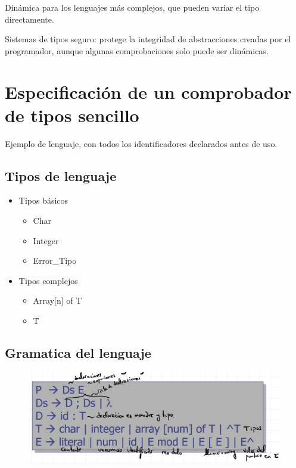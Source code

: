 \documentclass[12pt, twoside, openright]{report} %
\begin{document}
Dinámica para los lenguajes más complejos, que pueden variar el tipo directamente.

Sistemas de tipos seguro: protege la integridad de abstracciones creadas por el programador, aunque algunas comprobaciones solo puede ser dinámicas.

\section{Especificación de un comprobador de tipos sencillo}

Ejemplo de lenguaje, con todos los identificadores declarados antes de uso.

\subsection{Tipos de lenguaje}
\begin{itemize}
  \item Tipos básicos
  \begin{itemize}
    \item Char
    \item Integer
    \item Error\_Tipo
  \end{itemize}
  \item Tipos complejos
  \begin{itemize}
    \item Array[n] of T
    \item \^ T
  \end{itemize}
\end{itemize}

\subsection{Gramatica del lenguaje}
\begin{figure}[H]
  {\includegraphics[scale=.35]{Screenshot 2021-06-09 at 12.19.07.png}}
\end{figure}
\end{document}
